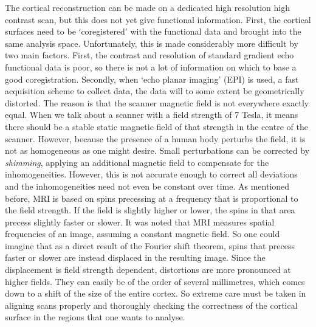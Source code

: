 The cortical reconstruction can be made on a dedicated high resolution high contrast scan, but this does not yet give functional information. First, the cortical surfaces need to be `coregistered' with the functional data and brought into the same analysis space. Unfortunately, this is made considerably more difficult by two main factors. First, the contrast and resolution of standard gradient echo functional data is poor, so there is not a lot of information on which to base a good coregistration. Secondly, when `echo planar imaging' (EPI) is used, a fast acquisition scheme to collect data, the data will to some extent be geometrically distorted. The reason is that the scanner magnetic field is not everywhere exactly equal. When we talk about a scanner with a field strength of 7 Tesla, it means there should be a stable static magnetic field of that strength in the centre of the scanner. However, because the presence of a human body perturbs the field, it is not as homogeneous as one might desire. Small perturbations can be corrected by \emph{shimming}, applying an additional magnetic field to compensate for the inhomogeneities. However, this is not accurate enough to correct all deviations and the inhomogeneities need not even be constant over time. As mentioned before, MRI is based on spins precessing at a frequency that is proportional to the field strength.
If the field is slightly higher or lower, the spins in that area precess slightly faster or slower. It was noted that MRI measures spatial frequencies of an image, assuming a constant magnetic field. So one could imagine that as a direct result of the Fourier shift theorem, spins that precess faster or slower are instead displaced in the resulting image. Since the displacement is field strength dependent, distortions are more pronounced at higher fields. They can easily be of the order of several millimetres, which comes down to a shift of the size of the entire cortex. So extreme care must be taken in aligning scans properly and thoroughly checking the correctness of the cortical surface in the regions that one wants to analyse. 


